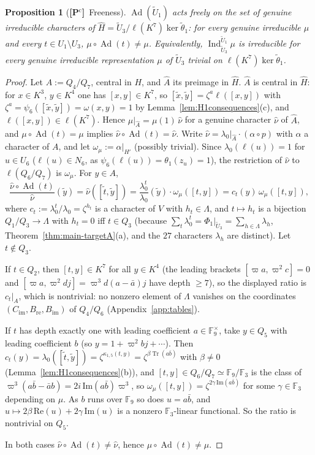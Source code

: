 \documentclass[11pt]{article}
\newcommand{\Fq}{\mathbb F}
\newcommand{\Tr}{\operatorname{Tr}}
\newcommand{\Ind}{\operatorname{Ind}}
\newcommand{\Ad}{\operatorname{Ad}}
\newcommand{\tU}{\widetilde U}
\newcommand{\tth}{\widetilde\theta}
\newcommand{\Pctag}{\textnormal{\textbf{[P$^{\mathrm c}$]}}}
\theoremstyle{plain}
\newtheorem{proposition}[theorem]{Proposition}
\theoremstyle{definition}
\begin{document}
\begin{proposition}[\Pctag\ Freeness]\label{prop:free}
$\Ad(\tU_1)$ acts freely on the set of genuine irreducible characters of
$\hat H=\tU_3/\ell(K^7)\ker\tth_1$: for every genuine irreducible $\mu$
and every $t\in U_1\setminus U_3$, $\mu\circ\Ad(t)\ne\mu$.
Equivalently, $\Ind_{\tU_3}^{\tU_1}\mu$ is irreducible for every genuine
irreducible representation $\mu$ of $\tU_3$ trivial on
$\ell(K^7)\ker\tth_1$.
\end{proposition}
\begin{proof}
Let $A:=Q_4/Q_7$, central in $H$, and $\hat A$ its preimage in $\hat H$.
$\hat A$ is central in $\hat H$: for $x\in K^3$, $y\in K^4$ one has
$[x,y]\in K^7$, so $[\tilde x,\tilde y]=\zeta^{a}\ell([x,y])$ with
$\zeta^a=\psi_6([\tilde x,\tilde y])=\omega(x,y)=1$ by
Lemma~\ref{lem:H1consequences}(c), and $\ell([x,y])\in\ell(K^7)$.  Hence
$\mu|_{\hat A}=\mu(1)\,\hat\nu$ for a genuine character $\hat\nu$ of
$\hat A$, and $\mu\circ\Ad(t)=\mu$ implies $\hat\nu\circ\Ad(t)=\hat\nu$.
Write $\hat\nu=\lambda_0|_{\hat A}\cdot(\alpha\circ p)$ with $\alpha$ a
character of $A$, and let $\omega_\mu:=\alpha|_{H'}$ (possibly trivial).
Since $\lambda_0(\ell(u))=1$ for $u\in U_6$ ($\ell(u)\in N_6$, as
$\psi_6(\ell(u))=\theta_1(z_u)=1$), the restriction of $\hat\nu$ to
$\ell(Q_6/Q_7)$ is $\omega_\mu$.  For $y\in A$,
\[
 \frac{\hat\nu\circ\Ad(t)}{\hat\nu}(\tilde y)=\hat\nu([\tilde t,\tilde y])
 =\frac{\lambda_0^t}{\lambda_0}(\tilde y)\cdot\omega_\mu([t,y])
 =c_t(y)\,\omega_\mu([t,y]),
\]
where $c_t:=\lambda_0^t/\lambda_0=\zeta^{h_t}$ is a character of $V$
with $h_t\in\Lambda$, and $t\mapsto h_t$ is a bijection
$Q_1/Q_3\to\Lambda$ with $h_t=0$ iff $t\in Q_3$ (because
$\sum_t\lambda_0^t=\Phi_1|_{\tU_3}=\sum_{h\in\Lambda}\lambda_h$,
Theorem~\ref{thm:main-targetA}(a), and the $27$ characters $\lambda_h$
are distinct).  Let $t\notin Q_3$.

If $t\in Q_2$, then $[t,y]\in K^7$ for all $y\in K^4$ (the leading
brackets $[\varpi a,\varpi^2c]=0$ and $[\varpi a,\varpi^2dj]=\varpi^3d(a-\bar a)j$
have depth $\ge7$), so the displayed ratio is $c_t|_A$, which is
nontrivial: no nonzero element of $\Lambda$ vanishes on the coordinates
$(C_{\mathrm{im}},B_{\mathrm{re}},B_{\mathrm{im}})$ of $Q_4/Q_6$
(Appendix~\ref{app:tables}).

If $t$ has depth exactly one with leading coefficient $a\in\Fq_9^\times$,
take $y\in Q_5$ with leading coefficient $b$ (so $y=1+\varpi^2bj+\cdots$).
Then $c_t(y)=\lambda_0([\tilde t,\tilde y])=\zeta^{\kappa_{1,5}(t,y)}=\zeta^{\beta\Tr(a\bar b)}$
with $\beta\ne0$ (Lemma~\ref{lem:H1consequences}(b)), and $[t,y]\in Q_6/Q_7\simeq\Fq_9/\Fq_3$
is the class of $\varpi^3(a\bar b-\bar ab)=2i\,\mathrm{Im}(a\bar b)\varpi^3$,
so $\omega_\mu([t,y])=\zeta^{2\gamma\,\mathrm{Im}(a\bar b)}$ for some
$\gamma\in\Fq_3$ depending on $\mu$.  As $b$ runs over $\Fq_9$ so does
$u=a\bar b$, and $u\mapsto2\beta\,\mathrm{Re}(u)+2\gamma\,\mathrm{Im}(u)$ is
a nonzero $\Fq_3$-linear functional.  So the ratio is nontrivial on
$Q_5$.

In both cases $\hat\nu\circ\Ad(t)\ne\hat\nu$, hence $\mu\circ\Ad(t)\ne\mu$.
\end{proof}
\end{document}
